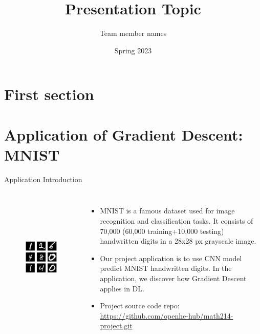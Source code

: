 \documentclass{beamer}
\title{Presentation Topic}
\author{Team member names}
\date{Spring 2023}
\begin{document}
\maketitle

\section{First section}

\section{Application of Gradient Descent: MNIST}
\begin{frame}{Application Introduction}
	\begin{columns}[T,onlytextwidth]
		\begin{figure}
			\centering 
			\includegraphics[width=1\columnwidth,height=6cm]{img/mnist.jpg}
			\caption{}
		\end{figure}
	
		\begin{itemize}
			\item MNIST is a famous dataset used for image
			recognition and classification tasks. It consists 
			of 70,000 (60,000 training+10,000 testing) 
			handwritten digits in a 28x28 px grayscale image.
			\item Our project application is to use CNN model
			predict MNIST handwritten digits. In the application,
			we discover how Gradient Descent applies in DL.
			\item Project source code repo: \href{https://github.com/openhe-hub/math214-project.git}{https://github.com/openhe-hub/math214-project.git} 
		\end{itemize}
	\end{columns}	
\end{frame}
\end{document}
